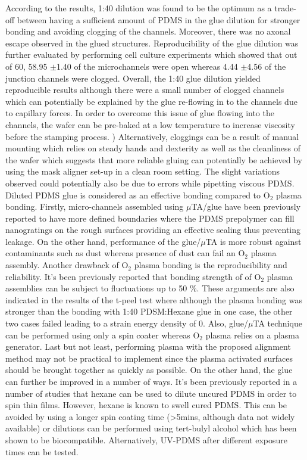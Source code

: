 \quad According to the results, 1:40 dilution was found to be the optimum as a trade-off between having a sufficient amount of PDMS in the glue dilution for stronger bonding and avoiding clogging of the channels. Moreover, there was no axonal escape observed in the glued structures. Reproducibility of the glue dilution was further evaluated by performing cell culture experiments which showed that out of 60, 58.95 $\pm$1.40 of the microchannels were open whereas 4.44 $\pm$4.56 of the junction channels were clogged. Overall, the 1:40 glue dilution yielded reproducible results although there were a small number of clogged channels which can potentially be explained by the glue re-flowing in to the channels due to capillary forces. In order to overcome this issue of glue flowing into the channels, the wafer can be pre-baked at a low temperature to increase viscosity before the stamping process. \cite{yang2019microfluidic}) Alternatively, cloggings can be a result of manual mounting which relies on steady hands and dexterity as well as the cleanliness of the wafer which suggests that more reliable gluing can potentially be achieved by using the mask aligner set-up in a clean room setting. The slight variations observed could potentially also be due to errors while pipetting viscous PDMS. Diluted PDMS glue is considered as an effective bonding compared to O$_{2}$ plasma bonding. Firstly, micro-channels assembled using $\mu$TA/glue have been previously reported to have more defined boundaries where the PDMS prepolymer can fill nanogratings on the rough surfaces providing an effective sealing thus preventing leakage. On the other hand, performance of the glue/$\mu$TA is more robust against contaminants such as dust whereas presence of dust can fail an O$_{2}$ plasma assembly. \cite{yang2019microfluidic} Another drawback of O$_{2}$ plasma bonding is the reproducibility and reliability. \cite{eddings2008determining} It's been previously reported that bonding strength of of O$_{2}$ plasma assemblies can be subject to fluctuations up to 50 $\%$. \cite{koh2012quantitative} \cite{duffy1998rapid} These arguments are also indicated in the results of the t-peel test where although the plasma bonding was stronger than the bonding with 1:40 PDSM:Hexane glue in one case, the other two cases failed leading to a strain energy density of 0. Also, glue/$\mu$TA technique can be performed using only a spin coater whereas O$_{2}$ plasma relies on a plasma generator. \cite{yang2019microfluidic} Last but not least, performing plasma with the proposed alignment method may not be practical to implement since the plasma activated surfaces should be brought together as quickly as possible. On the other hand, the glue can further be improved in a number of ways. It's been previously reported in a number of studies that hexane can be used to dilute uncured PDMS in order to spin thin films. \cite{koschwanez2009thin} However, hexane is known to swell cured PDMS. This can be avoided by using a longer spin coating time (>5mins, although data not widely available) or dilutions can be performed using tert-bulyl alcohol which has been shown to be biocompatible. Alternatively, UV-PDMS after different exposure times can be tested. 
 
